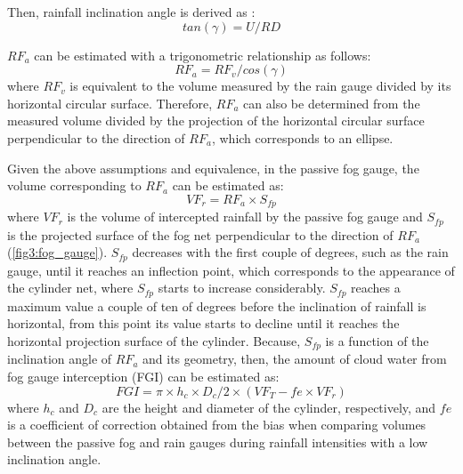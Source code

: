 \documentclass[a4paper,12pt]{article}
\begin{document}
\begin{linenumbers}
Then, rainfall inclination angle is derived as \citep{HerwitzandSlye1995, Holwerdaetal2006}:
\begin{equation} \label{eq:fog_gamma}
    tan(\gamma) = U/RD
\end{equation}

$RF_a$ can be estimated with a trigonometric relationship as follows:
 \begin{equation} \label{eq:fog_rain1}
    RF_a = RF_v/cos(\gamma)
\end{equation}
where $RF_v$ is equivalent to the volume measured by the rain gauge divided by its horizontal circular surface. Therefore, $RF_a$ can also be determined from the measured volume divided by the projection of the horizontal circular surface perpendicular to the direction of $RF_a$, which corresponds to an ellipse.

Given the above assumptions and equivalence, in the passive fog gauge, the volume corresponding to $RF_a$ can be estimated as:
 \begin{equation} \label{eq:fog_vol1}
    VF_r = RF_a \times S_{fp}
\end{equation}
where $VF_r$ is the volume of intercepted rainfall by the passive fog gauge and $S_{fp}$ is the projected surface of the fog net perpendicular to the direction of $RF_a$ (\autoref{fig3:fog_gauge}). $S_{fp}$ decreases with the first couple of degrees, such as the rain gauge, until it reaches an inflection point, which corresponds to the appearance of the cylinder net, where $S_{fp}$ starts to increase considerably. $S_{fp}$ reaches a maximum value a couple of ten of degrees before the inclination of rainfall is horizontal, from this point its value starts to decline until it reaches the horizontal projection surface of the cylinder. Because, $S_{fp}$ is a function of the inclination angle of $RF_a$ and its geometry, then, the amount of cloud water from fog gauge interception (FGI) can be estimated as:
 \begin{equation} \label{eq:fog_fog}
    FGI = \pi \times h_c \times D_c/2 \times (VF_T - fe \times VF_r)
\end{equation}
where $h_c$ and $D_c$ are the height and diameter of the cylinder, respectively, and $fe$ is a coefficient of correction obtained from the bias when comparing volumes between the passive fog and rain gauges during rainfall intensities with a low inclination angle.



\end{linenumbers}
\end{document}
